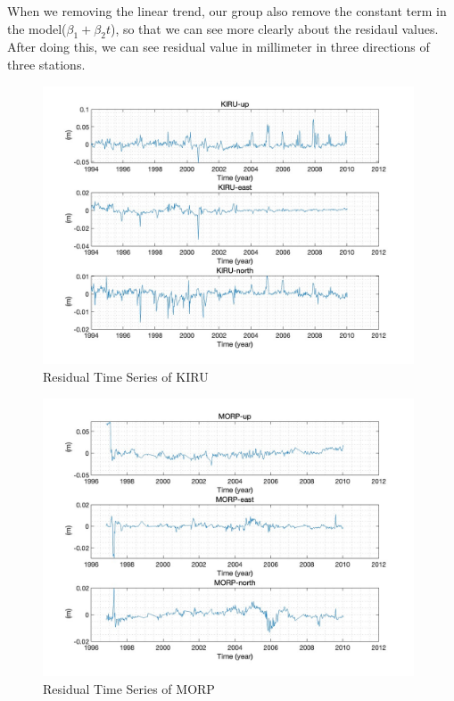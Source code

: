 \documentclass{article}
\begin{document}
When we removing the linear trend, our group also remove the constant term in the model($\beta_1 + \beta_2 t$), 
so that we can see more clearly about the residaul values.
After doing this, we can see residual value in millimeter in three directions of three stations.
\begin{figure}[H]
  \centering
  \includegraphics[width=11cm]{../result/re_figure/fig_kiru/4.jpg}
  \captionsetup{skip=0.2cm}
  \caption{Residual Time Series of KIRU}
  \label{fig:Res_KIRU}
\end{figure}
\begin{figure}[H]
  \centering
  \includegraphics[width=11cm]{../result/re_figure/fig_MORP/4.jpg}
  \caption{Residual Time Series of MORP}
  \label{fig:Res_MORP}
\end{figure}
\end{document}
